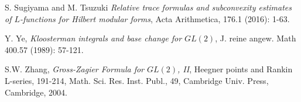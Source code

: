 \documentclass[11pt,reqno]{amsart}
\theoremstyle{definition}
\begin{document}
\begin{thebibliography}{100}
S. Sugiyama and M. Tsuzuki
{\it Relative trace formulas and subconvexity estimates of $L$-functions for Hilbert modular forms},
Acta Arithmetica, 176.1 (2016): 1-63.

Y. Ye, {\it Kloosterman integrals and base change for $GL(2)$},
J. reine angew. Math 400.57 (1989): 57-121.

S.W. Zhang, {\it Gross-Zagier Formula for $GL(2)$, II},
 Heegner points and Rankin L-series, 191-214,
Math. Sci. Res. Inst. Publ., 49, Cambridge Univ. Press, Cambridge, 2004.



\end{thebibliography}
\end{document}
